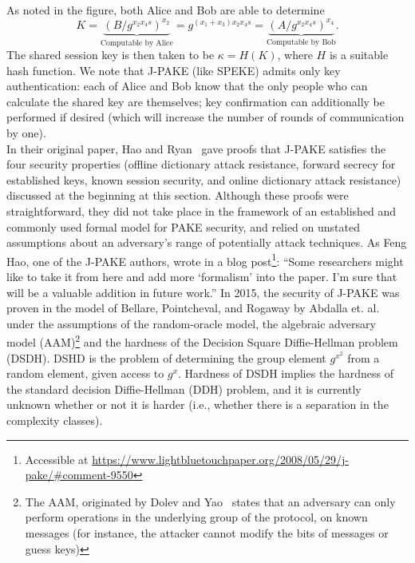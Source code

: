  As noted in the figure, both Alice and Bob are able to determine 
 \[ K = \underbrace{\left(B / g^{x_2x_4 s} \right)^{x_2}}_\text{Computable by Alice} = g^{(x_1+x_3)x_2x_4s} = 
 \underbrace{\left(A / g^{x_2x_4 s} \right)^{x_4}}_\text{Computable by Bob}. \]
 The shared session key is then taken to be $\kappa = H(K)$, where $H$ is a suitable hash function. 
 We note that J-PAKE (like SPEKE) admits only key authentication: each of Alice and 
 Bob know that the only people who can calculate the shared key are themselves; key confirmation can additionally be 
 performed if desired (which will increase the number of rounds of communication by one).
 \\

 In their original paper, Hao and Ryan~\cite{HaRy2010} gave proofs that J-PAKE satisfies the four security properties 
 (offline dictionary attack resistance, forward secrecy for established keys, known session security, and online dictionary attack resistance) 
discussed at the beginning at this section.  Although these proofs were straightforward, they did not take place in the framework of an established
and commonly used formal model for PAKE security, and relied on unstated assumptions about an adversary's range of potentially attack 
techniques.  As Feng Hao, one of the J-PAKE authors, wrote in a blog post\footnote{Accessible at 
\url{https://www.lightbluetouchpaper.org/2008/05/29/j-pake/\#comment-9550}}:
``Some researchers might like to take it from here and add more `formalism' into the paper.  I'm sure that will be a valuable addition in future work.''
In 2015, the security of J-PAKE was proven in the model of Bellare, Pointcheval, and Rogaway by Abdalla et. al.~\cite{AbdBenMac15} under the
assumptions of the random-oracle model, the algebraic adversary model (AAM)\footnote{The AAM, originated by Dolev and Yao~\cite{DoYa83} states that an adversary can only perform operations in the underlying group of the protocol, on known messages (for instance, the attacker cannot modify the bits of messages or guess keys)} and the hardness of the Decision Square Diffie-Hellman problem (DSDH). DSHD is the problem of determining the group element $g^{x^2}$ from a random element, given access to $g^x$. Hardness of DSDH implies the hardness of the standard decision Diffie-Hellman (DDH) problem, and it is currently unknown whether or not it is harder (i.e., whether there is a separation in the complexity classes).  


